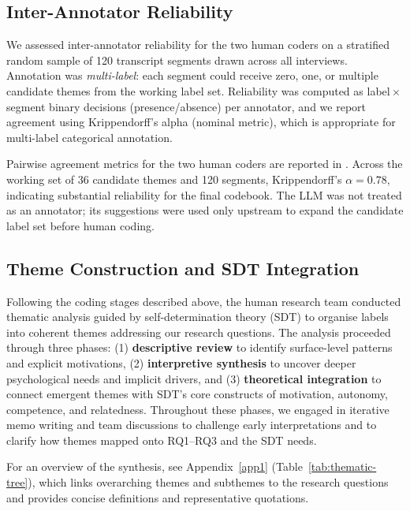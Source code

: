 
\subsection{Inter-Annotator Reliability}

We assessed inter-annotator reliability for the two human coders on a stratified random sample of 120 transcript segments drawn across all interviews. Annotation was \emph{multi-label}: each segment could receive zero, one, or multiple candidate themes from the working label set. Reliability was computed as label\,$\times$\,segment binary decisions (presence/absence) per annotator, and we report agreement using Krippendorff's alpha (nominal metric), which is appropriate for multi-label categorical annotation.

Pairwise agreement metrics for the two human coders are reported in . Across the working set of 36 candidate themes and 120 segments, Krippendorff's $\alpha = 0.78$, indicating substantial reliability for the final codebook. The LLM was not treated as an annotator; its suggestions were used only upstream to expand the candidate label set before human coding.

\begin{table}[H]
\centering
\caption{Pairwise inter-annotator agreement under multi-label annotation across 36 candidate themes for the two human coders. Agreement percentage and Krippendorff's alpha (nominal) are reported for the annotator pair.}
\label{tab:agreement}

\end{table}

\subsection{Theme Construction and SDT Integration}

Following the coding stages described above, the human research team conducted thematic analysis guided by self-determination theory (SDT) to organise labels into coherent themes addressing our research questions. The analysis proceeded through three phases: (1) \textbf{descriptive review} to identify surface-level patterns and explicit motivations, (2) \textbf{interpretive synthesis} to uncover deeper psychological needs and implicit drivers, and (3) \textbf{theoretical integration} to connect emergent themes with SDT's core constructs of motivation, autonomy, competence, and relatedness. Throughout these phases, we engaged in iterative memo writing and team discussions to challenge early interpretations and to clarify how themes mapped onto RQ1--RQ3 and the SDT needs.

For an overview of the synthesis, see Appendix~\ref{app1} (Table~\ref{tab:thematic-tree}), which links overarching themes and subthemes to the research questions and provides concise definitions and representative quotations.

